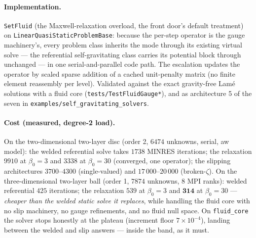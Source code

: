 \documentclass[11pt]{article}
\newcommand{\code}[1]{\texttt{#1}}
\begin{document}
\paragraph{Implementation.} \code{SetFluid} (the Maxwell-relaxation
overload, the front door's default treatment) on
\code{LinearQuasiStaticProblemBase}: because the per-step operator is
the gauge machinery's, every problem class inherits the mode through
its existing virtual solve --- the referential self-gravitating
class carries its potential block through unchanged --- in one
serial-and-parallel code path. The escalation updates the operator
by scaled sparse addition of a cached unit-penalty matrix (no finite
element reassembly per level). Validated against the exact
gravity-free Lam\'e solutions with a fluid core
(\code{tests/TestFluidGauge*}), and as architecture 5 of the seven in
\code{examples/self\_gravitating\_solvers}.

\paragraph{Cost (measured, degree-2 load).} On the two-dimensional
two-layer disc (order 2, $6474$ unknowns, serial, aw model): the
welded referential solve takes $1738$ MINRES iterations; the
relaxation $9910$ at $\beta_0 = 3$ and $3338$ at $\beta_0 = 30$
(converged, one operator); the slipping architectures $3700$--$4300$
(single-valued) and $17\,000$--$20\,000$ (broken-$\zeta$). On the
three-dimensional two-layer ball (order 1, $7874$ unknowns, 8 MPI
ranks): welded referential $425$ iterations; the relaxation $539$ at
$\beta_0 = 3$ and $\mathbf{314}$ at $\beta_0 = 30$ --- \emph{cheaper
than the welded static solve it replaces}, while handling the fluid
core with no slip machinery, no gauge refinements, and no fluid null
space. On \code{fluid\_core} the solver stops honestly at the
plateau (increment floor $7\times10^{-4}$), landing between the
welded and slip answers --- inside the band, as it must.
\end{document}

